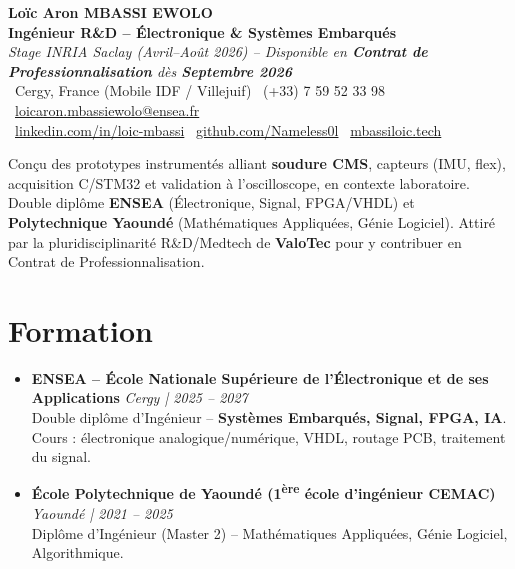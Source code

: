 \documentclass[a4paper,11pt]{article}
\begin{document}
\begin{center}
    {\Large \textbf{Loïc Aron MBASSI EWOLO}} \\ \vspace{4pt}
    \textbf{\large Ingénieur R\&D -- Électronique \& Systèmes Embarqués} \\
    \textit{\small Stage INRIA Saclay (Avril--Août 2026) -- Disponible en \textbf{Contrat de Professionnalisation} dès \textbf{Septembre 2026}} \\ \vspace{4pt}
    \small
    \faMapMarker\ Cergy, France (Mobile IDF / Villejuif) \quad
    \faPhone\ (+33) 7 59 52 33 98 \quad
    \faEnvelope\ \href{mailto:loicaron.mbassiewolo@ensea.fr}{loicaron.mbassiewolo@ensea.fr} \\ \vspace{2pt}
    \faLinkedin\ \href{https://www.linkedin.com/in/loic-mbassi/}{linkedin.com/in/loic-mbassi} \quad
    \faGithub\ \href{https://github.com/Nameless0l}{github.com/Nameless0l} \quad
    \faGlobe\ \href{https://mbassiloic.tech}{mbassiloic.tech}
\end{center}

\vspace{-6pt}

\noindent\small{Conçu des prototypes instrumentés alliant \textbf{soudure CMS}, capteurs (IMU, flex), acquisition C/STM32 et validation à l'oscilloscope, en contexte laboratoire. Double diplôme \textbf{ENSEA} (Électronique, Signal, FPGA/VHDL) et \textbf{Polytechnique Yaoundé} (Mathématiques Appliquées, Génie Logiciel). Attiré par la pluridisciplinarité R\&D/Medtech de \textbf{ValoTec} pour y contribuer en Contrat de Professionnalisation.}

\section{Formation}
\begin{itemize}[leftmargin=*, label=\tiny$\bullet$, nosep]
    \item \textbf{ENSEA -- École Nationale Supérieure de l'Électronique et de ses Applications} \hfill \textit{Cergy | 2025 -- 2027} \\
    \small{Double diplôme d'Ingénieur -- \textbf{Systèmes Embarqués, Signal, FPGA, IA}. Cours : électronique analogique/numérique, VHDL, routage PCB, traitement du signal.}
    \item \textbf{École Polytechnique de Yaoundé (1\textsuperscript{ère} école d'ingénieur CEMAC)} \hfill \textit{Yaoundé | 2021 -- 2025} \\
    \small{Diplôme d'Ingénieur (Master 2) -- Mathématiques Appliquées, Génie Logiciel, Algorithmique.}
\end{itemize}
\end{document}
